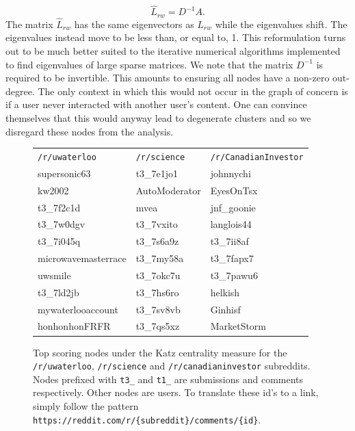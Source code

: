 \documentclass[letterpaper, 10 pt, conference]{ieeeconf}
\theoremstyle{definition}
\begin{document}
\[
  \hat{L}_{rw} = D^{-1}A.
\]
The matrix \(\hat{L}_{rw}\) has the same eigenvectors as \(L_{rw}\) while the eigenvalues shift. The eigenvalues instead move to be less than, or equal to, 1. This reformulation turns out to be much better suited to the iterative numerical algorithms implemented to find eigenvalues of large sparse matrices. We note that the matrix \(D^{-1}\) is required to be invertible. This amounts to ensuring all nodes have a non-zero out-degree. The only context in which this would not occur in the graph of concern is if a user never interacted with another user's content. One can convince themselves that this would anyway lead to degenerate clusters and so we disregard these nodes from the analysis.

\begin{figure}
  \centering
  \begin{tabular}{l|l|l}
    \texttt{/r/uwaterloo}   & \texttt{/r/science} & \texttt{/r/CanadianInvestor} \\ \hhline{=|=|=}
    supersonic63            & t3\_7e1jo1          & johnnychi \\ \hline
    kw2002                  & AutoModerator       & EyesOnTsx\\ \hline
    t3\_7f2c1d              & mvea                & jnf\_goonie\\ \hline
    t3\_7w0dgv              & t3\_7vxito          & langlois44\\ \hline
    t3\_7i045q              & t3\_7s6a9z          & t3\_7ii8af\\ \hline
    microwavemasterrace     & t3\_7my58a          & t3\_7fapx7\\ \hline
    uwsmile                 & t3\_7okc7u          & t3\_7pawu6\\ \hline
    t3\_7ld2jb              & t3\_7hs6ro          & helkish\\ \hline
    mywaterlooaccount       & t3\_7sv8vb          & Ginhisf\\ \hline
    honhonhonFRFR           & t3\_7qs5xz          & MarketStorm
  \end{tabular}
  \caption{Top scoring nodes under the Katz centrality measure for the \texttt{/r/uwaterloo}, \texttt{/r/science} and \texttt{/r/canadianinvestor} subreddits. Nodes prefixed with \texttt{t3\_} and \texttt{t1\_} are submissions and comments respectively. Other nodes are users. To translate these id's to a link, simply follow the pattern \texttt{https://reddit.com/r/\{subreddit\}/comments/\{id\}}.}
  \label{fig:analysis:katz-table}
\end{figure}
\end{document}
